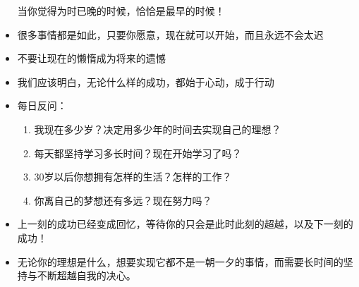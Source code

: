 \documentclass[UTF8,a4paper,8pt]{ctexart}
\begin{document}
\begin{itemize}
 	当你觉得为时已晚的时候，恰恰是最早的时候！
 	\item 很多事情都是如此，只要你愿意，现在就可以开始，而且永远不会太迟
 	\item 不要让现在的懒惰成为将来的遗憾
 	\item 我们应该明白，无论什么样的成功，都始于心动，成于行动
 	\item 每日反问：
 	\begin{enumerate}
 		\item 我现在多少岁？决定用多少年的时间去实现自己的理想？
 		\item 每天都坚持学习多长时间？现在开始学习了吗？
 		\item 30岁以后你想拥有怎样的生活？怎样的工作？
 		\item 你离自己的梦想还有多远？现在努力吗？
 	\end{enumerate} 
 	\item 上一刻的成功已经变成回忆，等待你的只会是此时此刻的超越，以及下一刻的成功！
 	\item 无论你的理想是什么，想要实现它都不是一朝一夕的事情，而需要长时间的坚持与不断超越自我的决心。
 	

\end{itemize}
\end{document}
